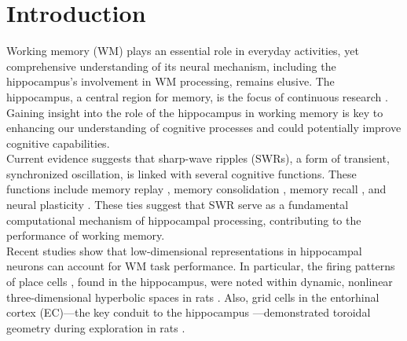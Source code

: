 \section{Introduction}
Working memory (WM) plays an essential role in everyday activities, yet comprehensive understanding of its neural mechanism, including the hippocampus's involvement in WM processing, remains elusive. The hippocampus, a central region for memory, is the focus of continuous research \cite{scoville_loss_1957} \cite{squire_legacy_2009}  \cite{boran_persistent_2019} \cite{kaminski_persistently_2017} \cite{kornblith_persistent_2017} \cite{faraut_dataset_2018} \cite{borders_hippocampus_2022} \cite{li_functional_2023} \cite{dimakopoulos_information_2022}. Gaining insight into the role of the hippocampus in working memory is key to enhancing our understanding of cognitive processes and could potentially improve cognitive capabilities.
\\
\indent
Current evidence suggests that sharp-wave ripples (SWRs), a form of transient, synchronized oscillation, is linked with several cognitive functions. These functions include memory replay \cite{wilson_reactivation_1994} \cite{nadasdy_replay_1999} \cite{lee_memory_2002} \cite{diba_forward_2007} \cite{davidson_hippocampal_2009}, memory consolidation \cite{girardeau_selective_2009} \cite{ego-stengel_disruption_2010} \cite{fernandez-ruiz_long-duration_2019} \cite{kim_corticalhippocampal_2022}, memory recall \cite{wu_hippocampal_2017} \cite{norman_hippocampal_2019} \cite{norman_hippocampal_2021}, and neural plasticity \cite{behrens_induction_2005} \cite{norimoto_hippocampal_2018}. These ties suggest that SWR serve as a fundamental computational mechanism of hippocampal processing, contributing to the performance of working memory.
\\
\indent
Recent studies show that low-dimensional representations in hippocampal neurons can account for WM task performance. In particular, the firing patterns of place cells \cite{okeefe_hippocampus_1971} \cite{okeefe_place_1976} \cite{ekstrom_cellular_2003} \cite{kjelstrup_finite_2008} \cite{harvey_intracellular_2009}, found in the hippocampus, were noted within dynamic, nonlinear three-dimensional hyperbolic spaces in rats \cite{zhang_hippocampal_2022}. Also, grid cells in the entorhinal cortex (EC)—the key conduit to the hippocampus \cite{naber_reciprocal_2001} \cite{van_strien_anatomy_2009} \cite{strange_functional_2014}—demonstrated toroidal geometry during exploration in rats \cite{gardner_toroidal_2022}.
\\
